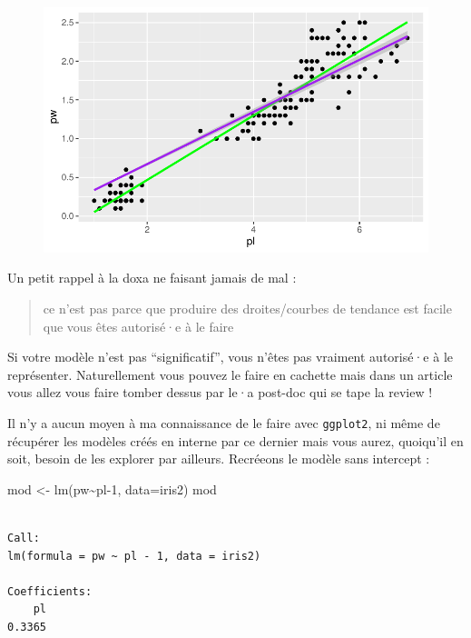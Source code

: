 \documentclass[
  letterpaper,
  DIV=11,
  numbers=noendperiod]{scrreprt}
\newenvironment{Shaded}{\begin{snugshade}}{\end{snugshade}}
\newcommand{\AttributeTok}[1]{\textcolor[rgb]{0.40,0.45,0.13}{#1}}
\newcommand{\DecValTok}[1]{\textcolor[rgb]{0.68,0.00,0.00}{#1}}
\newcommand{\FunctionTok}[1]{\textcolor[rgb]{0.28,0.35,0.67}{#1}}
\newcommand{\NormalTok}[1]{\textcolor[rgb]{0.00,0.23,0.31}{#1}}
\newcommand{\OtherTok}[1]{\textcolor[rgb]{0.00,0.23,0.31}{#1}}
\newcommand{\SpecialCharTok}[1]{\textcolor[rgb]{0.37,0.37,0.37}{#1}}
\begin{document}
\begin{figure}[H]

{\centering \includegraphics{ggplot2_files/figure-pdf/unnamed-chunk-12-1.pdf}

}

\end{figure}

Un petit rappel à la doxa ne faisant jamais de mal :

\begin{quote}
ce n'est pas parce que produire des droites/courbes de tendance est
facile que vous êtes autorisé·e à le faire
\end{quote}

Si votre modèle n'est pas ``significatif'', vous n'êtes pas vraiment
autorisé·e à le représenter. Naturellement vous pouvez le faire en
cachette mais dans un article vous allez vous faire tomber dessus par
le·a post-doc qui se tape la review !

Il n'y a aucun moyen à ma connaissance de le faire avec
\texttt{ggplot2}, ni même de récupérer les modèles créés en interne par
ce dernier mais vous aurez, quoiqu'il en soit, besoin de les explorer
par ailleurs. Recréeons le modèle sans intercept :

\begin{Shaded}
\begin{Highlighting}[]
\NormalTok{mod }\OtherTok{\textless{}{-}} \FunctionTok{lm}\NormalTok{(pw}\SpecialCharTok{\textasciitilde{}}\NormalTok{pl}\DecValTok{{-}1}\NormalTok{, }\AttributeTok{data=}\NormalTok{iris2)}
\NormalTok{mod}
\end{Highlighting}
\end{Shaded}

\begin{verbatim}

Call:
lm(formula = pw ~ pl - 1, data = iris2)

Coefficients:
    pl  
0.3365  
\end{verbatim}
\end{document}
